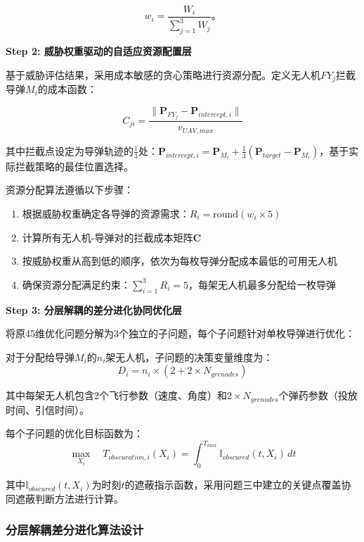 \documentclass[fontset=SimSun]{ctexart}
\begin{document}
\begin{equation}
w_i = \frac{W_i}{\sum_{j=1}^{3} W_j}。
\end{equation}

\noindent \textbf{Step 2: 威胁权重驱动的自适应资源配置层}

基于威胁评估结果，采用成本敏感的贪心策略进行资源分配。定义无人机$FY_j$拦截导弹$M_i$的成本函数：

\begin{equation}
C_{ji} = \frac{\|\mathbf{P}_{FY_j} - \mathbf{P}_{intercept,i}\|}{v_{UAV,max}}
\end{equation}

其中拦截点设定为导弹轨迹的$\frac{1}{3}$处：$\mathbf{P}_{intercept,i} = \mathbf{P}_{M_i} + \frac{1}{3}(\mathbf{P}_{target} - \mathbf{P}_{M_i})$，基于实际拦截策略的最佳位置选择。

资源分配算法遵循以下步骤：
\begin{enumerate}[leftmargin=1.5cm]
    \item 根据威胁权重确定各导弹的资源需求：$R_i = \text{round}(w_i \times 5)$
    \item 计算所有无人机-导弹对的拦截成本矩阵$\mathbf{C}$
    \item 按威胁权重从高到低的顺序，依次为每枚导弹分配成本最低的可用无人机
    \item 确保资源分配满足约束：$\sum_{i=1}^{3} R_i = 5$，每架无人机最多分配给一枚导弹
\end{enumerate}

\noindent \textbf{Step 3: 分层解耦的差分进化协同优化层}

 
将原45维优化问题分解为3个独立的子问题，每个子问题针对单枚导弹进行优化：

对于分配给导弹$M_i$的$n_i$架无人机，子问题的决策变量维度为：
\begin{equation}
D_i = n_i \times (2 + 2 \times N_{grenades})
\end{equation}

其中每架无人机包含2个飞行参数（速度、角度）和$2 \times N_{grenades}$个弹药参数（投放时间、引信时间）。

每个子问题的优化目标函数为：
\begin{equation}
\max_{X_i} \quad T_{obscuration,i}(X_i) = \int_{0}^{T_{max}} \mathbb{I}_{obscured}(t, X_i) \, dt
\end{equation}

其中$\mathbb{I}_{obscured}(t, X_i)$为时刻$t$的遮蔽指示函数，采用问题三中建立的关键点覆盖协同遮蔽判断方法进行计算。

\subsubsection{分层解耦差分进化算法设计}
\end{document}
